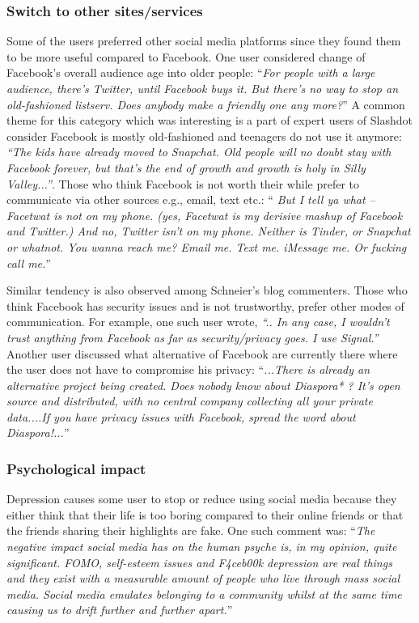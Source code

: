  \subsubsection{Switch to other sites/services}
 Some of the users preferred other social media platforms since they found them to be more useful compared to Facebook. One user considered change of Facebook's overall audience age into older people: 
     ``\textit{For people with a large audience, there's Twitter, until Facebook buys it. But there's no way to stop an old-fashioned listserv. Does anybody make a friendly one any more?}'' A common theme for this category which was interesting is a part of expert users of Slashdot consider Facebook is mostly old-fashioned and teenagers do not use it anymore: \textit{``The kids have already moved to Snapchat. Old people will no doubt stay with Facebook forever, but that's the end of growth and growth is holy in Silly Valley...''}. Those who think Facebook is not worth their while prefer to communicate via other sources e.g., email, text etc.:
    ``\textit{ But I tell ya what -- Facetwat is not on my phone. (yes, Facetwat is my derisive mashup of Facebook and Twitter.) And no, Twitter isn't on my phone. Neither is Tinder, or Snapchat or whatnot. You wanna reach me? Email me. Text me. iMessage me. Or fucking call me.}''
    
    Similar tendency is also observed among Schneier's blog commenters. Those who think Facebook has security issues and is not trustworthy, prefer other modes of communication. For example, one such user wrote, \textit{``.. In any case, I wouldn't trust anything from Facebook as far as security/privacy goes. I use Signal.''} Another user discussed what alternative of Facebook are currently there where the user does not have to compromise his privacy:
    ``\textit{...There is already an alternative project being created. Does nobody know about Diaspora* ? It's open source and distributed, with no central company collecting all your private data....If you have privacy issues with Facebook, spread the word about Diaspora!...}''
    


 \subsubsection{Psychological impact}
  Depression causes some user to stop or reduce using social media because they either think that their life is too boring compared to their online friends or that the friends sharing their highlights are fake. One such comment was: ``\textit{The negative impact social media has on the human psyche is, in my opinion, quite significant. FOMO, self-esteem issues and F4ceb00k depression are real things and they exist with a measurable amount of people who live through mass social media. Social media emulates belonging to a community whilst at the same time causing us to drift further and further apart.}''
    
